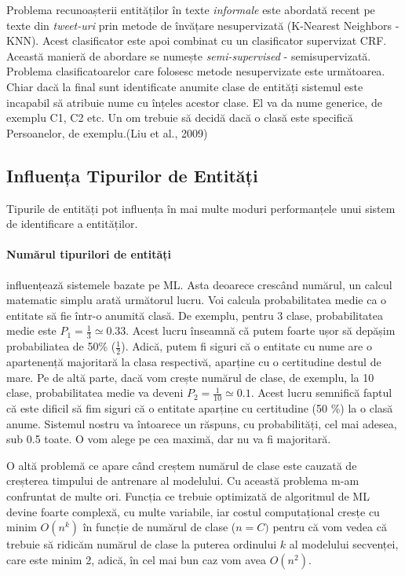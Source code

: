 Problema recunoașterii entităților în texte \textit{informale} este abordată recent pe texte din \textit{tweet-uri} prin metode de învățare nesupervizată (K-Nearest Neighbors - KNN). Acest clasificator este apoi combinat cu un clasificator supervizat CRF. Această manieră de abordare se numește \textit{semi-supervised} - semisupervizată. Problema clasificatoarelor care folosesc metode nesupervizate este următoarea. Chiar dacă la final sunt identificate anumite clase de entități sistemul este incapabil să atribuie nume cu înțeles acestor clase. El va da nume generice, de exemplu C1, C2 etc. Un om trebuie să decidă dacă o clasă este specifică Persoanelor, de exemplu.(Liu et al., 2009)\cite{Liu_recognizingnamed}


\subsection{Influența Tipurilor de Entități}

Tipurile de entități pot influența în mai multe moduri performanțele unui sistem de identificare a entităților. 

\paragraph{Numărul tipurilori de entități}

influențează sistemele bazate pe ML. Asta deoarece crescând numărul, un calcul matematic simplu arată următorul lucru. Voi calcula probabilitatea medie ca o entitate să fie într-o anumită clasă. De exemplu, pentru 3 clase, probabilitatea medie este $ P_1 = \frac{1}{3} \simeq 0.33 $. Acest lucru înseamnă că putem foarte ușor să depășim probabiliatea de 50\% ($ \frac{1}{2} $). Adică, putem fi siguri că o entitate cu nume are o apartenență majoritară la clasa respectivă, aparține cu o certitudine destul de mare. Pe de altă parte, dacă vom crește numărul de clase, de exemplu, la 10 clase, probabilitatea medie va deveni $ P_2 = \frac{1}{10} \simeq 0.1 $. Acest lucru semnifică faptul că este dificil să fim siguri că o entitate aparține cu certitudine (50 \%) la o clasă anume. Sistemul nostru va întoarece un răspuns, cu probabilități, cel mai adesea, sub 0.5 toate. O vom alege pe cea maximă, dar nu va fi majoritară. 

O altă problemă ce apare când creștem numărul de clase este cauzată de creșterea timpului de antrenare al modelului. Cu această problema m-am confruntat de multe ori. Funcția ce trebuie optimizată de algoritmul de ML devine foarte complexă, cu multe variabile, iar costul computațional cresțe cu minim $ O(n^k) $ în funcție de numărul de clase ($n = C)$ pentru că vom vedea că trebuie să ridicăm numărul de clase la puterea ordinului $k$ al modelului secvenței, care este minim 2, adică, în cel mai bun caz vom avea $ O(n^2) $.

